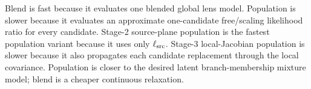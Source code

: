 \documentclass[11pt]{article}
\begin{document}
Blend is fast because it evaluates one blended global lens model. Population is
slower because it evaluates an approximate one-candidate free/scaling
likelihood ratio for every candidate. Stage-2 source-plane population is the
fastest population variant because it uses only $\ell_{\rm src}$. Stage-3
local-Jacobian population is slower because it also propagates each candidate
replacement through the local covariance. Population is closer to the desired
latent branch-membership mixture model; blend is a cheaper continuous
relaxation.
\end{document}
